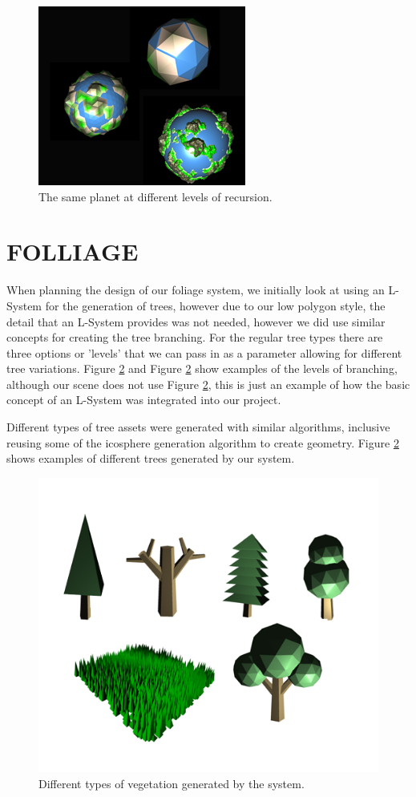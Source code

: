 \documentclass[a4paper,twoside]{article}
\begin{document}
\begin{figure}
\centering
\includegraphics[scale=0.75]{./images/planets/planets.png}
\caption{The same planet at different levels of recursion.}
\label{fig_iterations}
\end{figure}

\section{\uppercase{Folliage}}
\label{sec:fol}
\noindent When planning the design of our foliage system, we initially look at using an L-System for the generation of trees, however due to our low polygon style, the detail that an L-System provides  was not needed, however we did use similar concepts for creating the tree branching. 
For the regular tree types there are three options or 'levels' that we can pass in as a parameter allowing for different tree variations. Figure \ref{fig_all_trees} and Figure \ref{fig_all_trees} show examples of the levels of branching, although our scene does not use Figure \ref{fig_all_trees}, this is just an example of how the basic concept of an L-System was integrated into our project.

Different types of tree assets were generated with similar algorithms, inclusive reusing some of the icosphere generation algorithm to create geometry. Figure \ref{fig_all_trees} shows examples of different trees generated by our system.

\begin{figure}
\centering
\includegraphics[scale=0.3]{./images/trees/alltrees.png}
\caption{Different types of vegetation generated by the system.}
\label{fig_all_trees}
\end{figure}


{\small
}
\vfill
\end{document}
